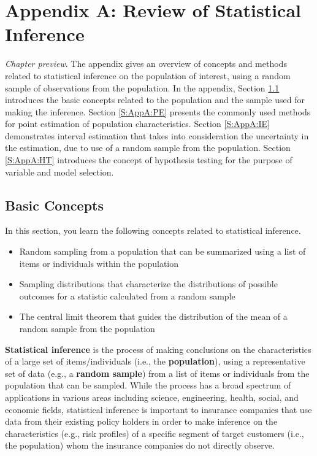 \documentclass[]{book}
\providecommand{\tightlist}{%
  \setlength{\itemsep}{0pt}\setlength{\parskip}{0pt}}
\theoremstyle{definition}
\theoremstyle{definition}
\theoremstyle{definition}
\theoremstyle{remark}
\begin{document}
\chapter{Appendix A: Review of Statistical Inference}\label{C:AppA}

\emph{Chapter preview}. The appendix gives an overview of concepts and
methods related to statistical inference on the population of interest,
using a random sample of observations from the population. In the
appendix, Section \ref{S:AppA:BASIC} introduces the basic concepts
related to the population and the sample used for making the inference.
Section \ref{S:AppA:PE} presents the commonly used methods for point
estimation of population characteristics. Section \ref{S:AppA:IE}
demonstrates interval estimation that takes into consideration the
uncertainty in the estimation, due to use of a random sample from the
population. Section \ref{S:AppA:HT} introduces the concept of hypothesis
testing for the purpose of variable and model selection.

\section{Basic Concepts}\label{S:AppA:BASIC}

In this section, you learn the following concepts related to statistical
inference.

\begin{itemize}
\tightlist
\item
  Random sampling from a population that can be summarized using a list
  of items or individuals within the population
\item
  Sampling distributions that characterize the distributions of possible
  outcomes for a statistic calculated from a random sample
\item
  The central limit theorem that guides the distribution of the mean of
  a random sample from the population
\end{itemize}

\textbf{Statistical inference} is the process of making conclusions on
the characteristics of a large set of items/individuals (i.e., the
\textbf{population}), using a representative set of data (e.g., a
\textbf{random sample}) from a list of items or individuals from the
population that can be sampled. While the process has a broad spectrum
of applications in various areas including science, engineering, health,
social, and economic fields, statistical inference is important to
insurance companies that use data from their existing policy holders in
order to make inference on the characteristics (e.g., risk profiles) of
a specific segment of target customers (i.e., the population) whom the
insurance companies do not directly observe.
\end{document}
